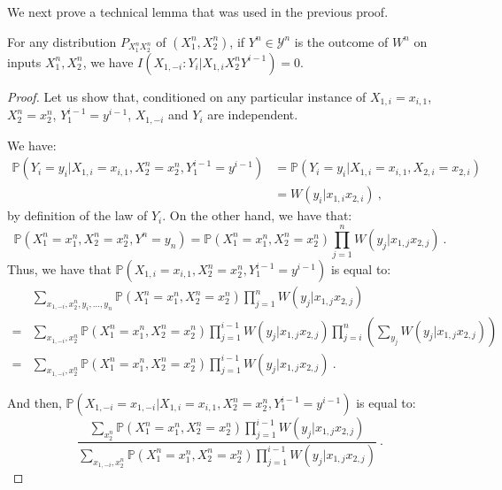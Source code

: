   We next prove a technical lemma that was used in the previous proof.  
      \begin{lemma}
        \label{lem:claim1}
        For any distribution $P_{X_1^nX_2^n}$ of $(X_1^n,X_2^n)$, if $Y^n \in \mathcal{Y}^n$ is the outcome of $W^n$ on inputs $X_1^n,X_2^n$, we have $I(X_{1,-i}:Y_i|X_{1,i}X_2^nY^{i-1}) = 0$.
      \end{lemma}
      \begin{proof}
        Let us show that, conditioned on any particular instance of $X_{1,i}=x_{i,1}$, $X_2^n=x_2^n$, $Y_1^{i-1}=y^{i-1}$, $X_{1,-i}$ and $Y_i$ are independent.

        We have:
        \begin{equation}
          \begin{aligned}
            \mathbb{P}\left(Y_i = y_i |  X_{1,i}=x_{i,1}, X_2^n=x_2^n, Y_1^{i-1}=y^{i-1}\right) &= \mathbb{P}\left(Y_i = y_i |  X_{1,i}=x_{i,1}, X_{2,i}=x_{2,i}\right)\\
            &= W(y_i|x_{1,i}x_{2,i}) \ ,
          \end{aligned}
        \end{equation}
        by definition of the law of $Y_i$. On the other hand, we have that:
        \[ \mathbb{P}\left(X_1^n=x_1^n,X_2^n=x_2^n,Y^n=y_n\right) = \mathbb{P}\left(X_1^n=x_1^n,X_2^n=x_2^n\right)\prod_{j=1}^n W(y_j|x_{1,j}x_{2,j}) \ . \]
        Thus, we have that $\mathbb{P}\left(X_{1,i}=x_{i,1}, X_2^n=x_2^n, Y_1^{i-1}=y^{i-1}\right)$ is equal to:
        \begin{equation}
          \begin{aligned}
            &\sum_{x_{1,-i},x_2^n,y_i,\ldots, y_n}\mathbb{P}\left(X_1^n=x_1^n,X_2^n=x_2^n\right)\prod_{j=1}^n W(y_j|x_{1,j}x_{2,j})\\
            = &\sum_{x_{1,-i},x_2^n} \mathbb{P}\left(X_1^n=x_1^n,X_2^n=x_2^n\right)\prod_{j=1}^{i-1}W(y_j|x_{1,j}x_{2,j})\prod_{j=i}^n\left(\sum_{y_j}W(y_j|x_{1,j}x_{2,j})\right)\\
            = &\sum_{x_{1,-i},x_2^n} \mathbb{P}\left(X_1^n=x_1^n,X_2^n=x_2^n\right)\prod_{j=1}^{i-1}W(y_j|x_{1,j}x_{2,j}) \ .
          \end{aligned}
        \end{equation}

        And then, $\mathbb{P}\left(X_{1,-i}=x_{1,-i}|X_{1,i}=x_{i,1}, X_2^n=x_2^n, Y_1^{i-1}=y^{i-1}\right)$ is equal to:
        \[ \frac{\sum_{x_2^n}\mathbb{P}\left(X_1^n=x_1^n,X_2^n=x_2^n\right)\prod_{j=1}^{i-1} W(y_j|x_{1,j}x_{2,j})}{\sum_{x_{1,-i},x_2^n}\mathbb{P}\left(X_1^n=x_1^n,X_2^n=x_2^n\right)\prod_{j=1}^{i-1} W(y_j|x_{1,j}x_{2,j})} \ . \]
        

\end{proof}
